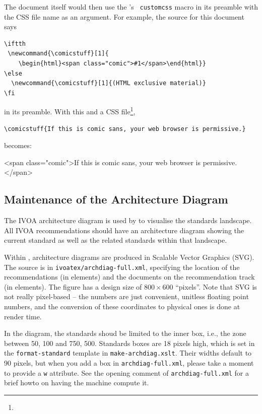 \documentclass[11pt,a4paper]{ivoa}
\newcommand{\texword}[1]{\texttt{\color{texcolor} #1}}
\newcommand{\comicstuff}[1]{
    \begin{html}<span class="comic">#1</span>\end{html}}
\newcommand{\comicstuff}[1]{(HTML exclusive material)}
\begin{document}
The document itself would then use the \ivoatex's \texword{customcss}
macro in its preamble with the CSS file name as an argument.  For
example, the source for this document says

\begin{lstlisting}
\iftth
 \newcommand{\comicstuff}[1]{
    \begin{html}<span class="comic">#1</span>\end{html}}
\else
  \newcommand{\comicstuff}[1]{(HTML exclusive material)}
\fi
\end{lstlisting}

\noindent in its preamble.  With this and a CSS
file\footnote{},

\begin{lstlisting}
\comicstuff{If this is comic sans, your web browser is permissive.}
\end{lstlisting}

\noindent becomes: 
\comicstuff{If this is comic sans, your web browser is permissive.}

\subsection{Maintenance of the Architecture Diagram}

The IVOA architecture diagram is used by
\citet{2021ivoa.spec.1101D} to
visualise the standards landscape.  All IVOA recommendations should have
an architecture diagram showing the current standard as well as the
related standards within that landscape.

Within \ivoatex, architecture diagrams are produced in Scalable Vector
Graphics (SVG).  The source is in \texttt{ivoatex/archdiag-full.xml},
specifying the location of the recommendations (in  elements)
and the documents on the recommendation track (in 
elements).  The figure has a design size of $800\times 600$ ``pixels''.
Note that SVG is not really pixel-based -- the numbers are just
convenient, unitless floating point numbers, and the conversion of these
coordinates to physical ones is done at render time.

In the diagram, the standards shoud be limited to the inner box, i.e.,
the zone between 50, 100 and 750, 500.  Standards boxes are 
18 pixels high, which is set in the \texttt{format-standard} template
in \texttt{make-archdiag.xslt}.  Their widths default to 90 pixels, but
when you add a box in \verb|archdiag-full.xml|, please take a moment to
provide a \verb|w| attribute.  See the opening comment of
\verb|archdiag-full.xml| for a brief howto on having the machine compute
it.
\end{document}
